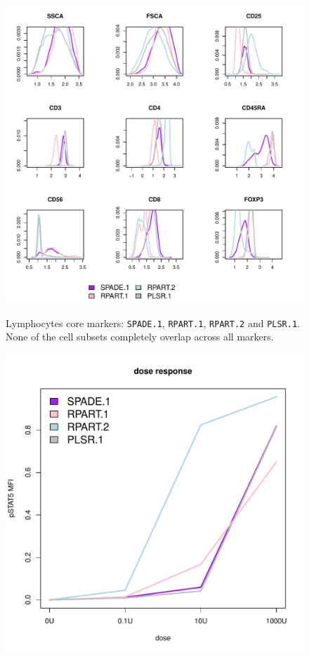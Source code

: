 \begin{figure}
\centering
\begin{minipage}{.65\textwidth}
    \includegraphics[width=\linewidth]{figures/final-lymphocytes-clusters}
\end{minipage}
{ Lymphocytes core markers: \texttt{SPADE.1}, \texttt{RPART.1}, \texttt{RPART.2} and \texttt{PLSR.1}. }
{ 
    None of the cell subsets completely overlap across all markers.
}
\begin{minipage}{.5\textwidth}
    \includegraphics[scale=0.4]{figures/final-lymphocytes-dose-response}

\end{minipage}
\end{figure}
